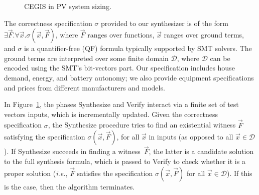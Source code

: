 \documentclass[runningheads]{llncs}
\begin{document}
\begin{figure}[h]
\begin{center}
\end{center}
%
	\caption{CEGIS in PV system sizing.}
	\label{Counter-Example-Guided-Inductive-Synthesis}
\end{figure}

The correctness specification $\sigma$ provided to our synthesizer is of the form $\exists \vec{F}. \forall \vec{x}. \sigma(\vec{x}, \vec{F})$, where $\vec{F}$ ranges over functions, $\vec{x}$ ranges over ground terms, and $\sigma$ is a quantifier-free (QF) formula typically supported by SMT solvers. The ground terms are interpreted over some finite domain $\mathcal{D}$, where $\mathcal{D}$ can be encoded using the SMT's bit-vectors part. Our specification includes house demand, energy, and battery autonomy; we also provide equipment specifications and prices from different manufacturers and models.

In Figure~\ref{Counter-Example-Guided-Inductive-Synthesis}, the phases {\sc Synthesize} and {\sc Verify} interact via a finite set of test vectors {\sc inputs}, which is incrementally updated. Given the correctness specification $\sigma$, the {\sc Synthesize} procedure tries to find an existential witness $\vec{F}$ satisfying the specification $\sigma(\vec{x}, \vec{F})$, for all $\vec{x}$ in {\sc inputs} (as opposed to all $\vec{x} \in \mathcal{D}$). If {\sc Synthesize} succeeds in finding a witness~$\vec{F}$, the latter is a candidate solution to the full synthesis formula, which is passed to {\sc Verify} to check whether it is a proper solution ({\it i.e.}, $\vec{F}$ satisfies the specification $\sigma(\vec{x}, \vec{F})$ for all $\vec{x}\in\mathcal{D}$). If this is the case, then the algorithm terminates.
\end{document}
